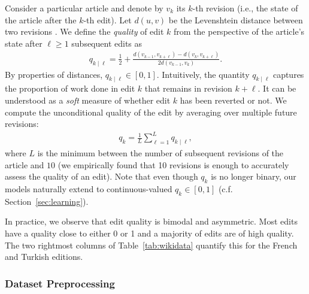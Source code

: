 \documentclass[format=sigconf]{acmart}
\begin{document}
Consider a particular article and denote by $v_k$ its $k$-th revision (i.e., the state of the article after the $k$-th edit).
Let $d(u, v)$ be the Levenshtein distance between two revisions \citep{kruskal1983overview}.
We define the \emph{quality} of edit $k$ from the perspective of the article's state after $\ell \ge 1$ subsequent edits as
\begin{align*}
q_{k \mid \ell} = \frac{1}{2} + \frac{d(v_{k-1}, v_{k + \ell}) - d(v_k, v_{k + \ell})}{2 d(v_{k-1}, v_k)}.
\end{align*}
By properties of distances, $q_{k \mid \ell} \in [0, 1]$.
Intuitively, the quantity $q_{k \mid \ell}$ captures the proportion of work done in edit $k$ that remains in revision $k + \ell$.
It can be understood as a \emph{soft} measure of whether edit $k$ has been reverted or not.
We compute the unconditional quality of the edit by averaging over multiple future revisions:
\begin{align}
\label{eq:wikiqual}
q_k = \frac{1}{L} \sum_{\ell = 1}^L q_{k \mid \ell},
\end{align}
where $L$ is the minimum between the number of subsequent revisions of the article and $10$ (we empirically found that \num{10} revisions is enough to accurately assess the quality of an edit).
Note that even though $q_k$ is no longer binary, our models naturally extend to continuous-valued $q_k \in [0,1]$ (c.f. Section~\ref{sec:learning}).

In practice, we observe that edit quality is bimodal and asymmetric.
Most edits have a quality close to either \num{0} or \num{1} and a majority of edits are of high quality.
The two rightmost columns of Table~\ref{tab:wikidata} quantify this for the French and Turkish editions.

\subsubsection{Dataset Preprocessing}
\end{document}

